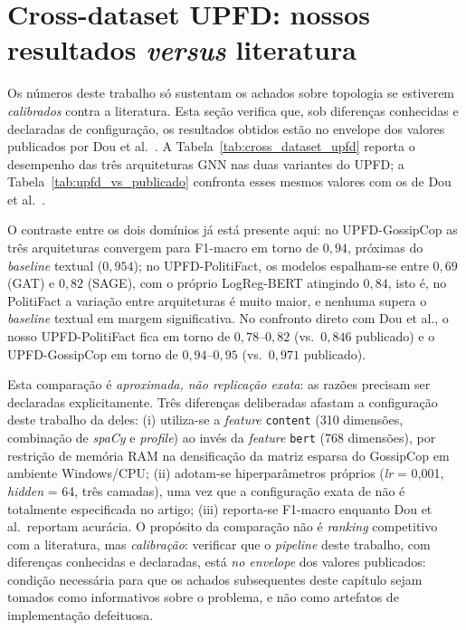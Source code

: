 \section{Cross-dataset UPFD: nossos resultados \emph{versus} literatura}
\label{sec:cross_dataset}

Os n\'umeros deste trabalho s\'o sustentam os achados sobre topologia se
estiverem \emph{calibrados} contra a literatura. Esta se\c{c}\~ao verifica que,
sob diferen\c{c}as conhecidas e declaradas de configura\c{c}\~ao, os resultados
obtidos est\~ao no envelope dos valores publicados por Dou et al.~\cite{dou2021upfd}. A
Tabela~\ref{tab:cross_dataset_upfd} reporta o desempenho das tr\^es
arquiteturas GNN nas duas variantes do UPFD; a
Tabela~\ref{tab:upfd_vs_publicado} confronta esses mesmos valores com
os de Dou et al.~\cite{dou2021upfd}.




O contraste entre os dois dom\'inios j\'a est\'a presente aqui: no
UPFD-GossipCop as tr\^es arquiteturas convergem para F1-macro em torno
de $0{,}94$, pr\'oximas do \emph{baseline} textual ($0{,}954$); no
UPFD-PolitiFact, os modelos espalham-se entre $0{,}69$ (GAT) e $0{,}82$
(SAGE), com o pr\'oprio LogReg-BERT atingindo $0{,}84$, isto \'e, no
PolitiFact a varia\c{c}\~ao entre arquiteturas \'e muito maior, e
nenhuma supera o \emph{baseline} textual em margem significativa. No
confronto direto com Dou et al., o nosso UPFD-PolitiFact fica em torno
de $0{,}78$--$0{,}82$ (vs.\ $0{,}846$ publicado) e o UPFD-GossipCop em
torno de $0{,}94$--$0{,}95$ (vs.\ $0{,}971$ publicado).

Esta compara\c{c}\~ao \'e \emph{aproximada, n\~ao replica\c{c}\~ao
exata}: as raz\~oes precisam ser declaradas explicitamente. Tr\^es
diferen\c{c}as deliberadas afastam a configura\c{c}\~ao deste trabalho da deles:
(i) utiliza-se a \emph{feature} \texttt{content} (310 dimens\~oes,
combina\c{c}\~ao de \emph{spaCy} e \emph{profile}) ao inv\'es da
\emph{feature} \texttt{bert} (768 dimens\~oes), por restri\c{c}\~ao de
mem\'oria RAM na densifica\c{c}\~ao da matriz esparsa do GossipCop em
ambiente Windows/CPU; (ii) adotam-se hiperpar\^ametros pr\'oprios
(\emph{lr} = 0,001, \emph{hidden} = 64, tr\^es camadas), uma vez que a
configura\c{c}\~ao exata de \cite{dou2021upfd} n\~ao \'e totalmente
especificada no artigo; (iii) reporta-se F1-macro enquanto Dou et al.\
reportam acur\'acia. O prop\'osito da compara\c{c}\~ao n\~ao \'e
\emph{ranking} competitivo com a literatura, mas \emph{calibra\c{c}\~ao}:
verificar que o \emph{pipeline} deste trabalho, com diferen\c{c}as conhecidas e
declaradas, est\'a \emph{no envelope} dos valores publicados:
condi\c{c}\~ao necess\'aria para que os achados subsequentes deste
cap\'itulo sejam tomados como informativos sobre o problema, e n\~ao
como artefatos de implementa\c{c}\~ao defeituosa.

